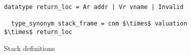 \begin{figure}
  \begin{lstlisting}[frame=single, mathescape=true]
  datatype return_loc = Ar addr | Vr vname | Invalid

  type_synonym stack_frame = com $\times$ valuation $\times$ return_loc
  \end{lstlisting}

  \caption{Stack definitions}
  \label{fig:stack_def}
\end{figure}

\begin{comment}
\begin{figure}
  \begin{subfigure}{0.3\textwidth}
  \begin{lstlisting}[mathescape=true]
  int sum(int a; int b){
    return a+b;
  }

  int main(){
    int x = 0;
    x = sum(2,2);
  }
  \end{lstlisting}
  \caption{Example code in C}
  \label{fig:stack_ex_c_code}
  \end{subfigure}
  \begin{subfigure}{0.3\textwidth}
    \begin{tabular}{|c|}
      \hline
      \hline
      $\vdots$ \\
      \\
      \hline
      $(x = \mathtt{sum}(2,2),$ \\
      $[x \mapsto 0],$ \\
      $ Invalid )$ \\
      \hline \hline
    \end{tabular}
  \caption{Stack before function call (Stack grows upwards)}
  \label{fig:stack_bef_fun_call}
  \end{subfigure}
  \begin{subfigure}{0.3\textwidth}
    \begin{tabular}{|c|}
      \hline
      \hline
      $\vdots$ \\
      \\
      \hline
      $(\mathtt{return}\ a+b,$ \\
      $[a \mapsto 2, b \mapsto 2],$ \\
      $ Invalid )$ \\
      \hline
      $(x = f(2,2),$ \\
      $[x \mapsto 0],$ \\
      $ x )$ \\
      \hline \hline
    \end{tabular}
  \caption{Stack after function call (Stack grows upwards)}
  \label{fig:stack_aft_fun_call}
  \end{subfigure}

  \caption{Ejemplo de convención de llamada}
  \label{fig:stack_example}
\end{figure}
\end{comment}


